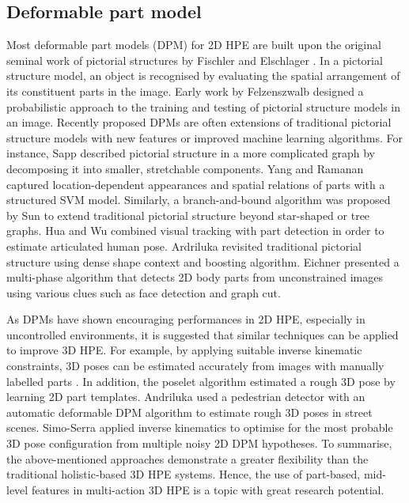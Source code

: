 \subsection{Deformable part model}  
Most deformable part models (DPM) for 2D HPE are built upon the original seminal work of pictorial structures by Fischler and Elschlager \cite{Fischler1981}. In a pictorial structure model, an object is recognised by evaluating the spatial arrangement of its constituent parts in the image. Early work by Felzenszwalb \etal \cite{Felzenszwalb2000, Felzenszwalb2005} designed a probabilistic approach to the training and testing of pictorial structure models in an image. Recently proposed DPMs are often extensions of traditional pictorial structure models with new features or improved machine learning algorithms. For instance, Sapp \etal \cite{Sapp2011} described pictorial structure in a more complicated graph by decomposing it into smaller, stretchable components. Yang and Ramanan \cite{Yang2011} captured location-dependent appearances and spatial relations of parts with a structured SVM model. Similarly, a branch-and-bound algorithm was proposed by Sun \etal \cite{Sun2012a} to extend traditional pictorial structure beyond star-shaped or tree graphs. Hua and Wu \cite{Hua2007} combined visual tracking with part detection in order to estimate articulated human pose. Ardriluka \etal \cite{Andriluka2009} revisited traditional pictorial structure using dense shape context and boosting algorithm. Eichner \etal \cite{Eichner2012} presented a multi-phase algorithm that detects 2D body parts from unconstrained images using various clues such as face detection and graph cut. 

As DPMs have shown encouraging performances in 2D HPE, especially in uncontrolled environments, it is suggested that similar techniques can be applied to improve 3D HPE. For example, by applying suitable inverse kinematic constraints, 3D poses can be estimated accurately from images with manually labelled parts \cite{Wei2009, Ramakrishna2012}. In addition, the poselet algorithm \cite{Bourdev2009} estimated a rough 3D pose by learning 2D part templates. Andriluka \etal \cite{Andriluka2010} used a pedestrian detector with an automatic deformable DPM algorithm to estimate rough 3D poses in street scenes. Simo-Serra \etal \cite{Simo-Serra2012} applied inverse kinematics to optimise for the most probable 3D pose configuration from multiple noisy 2D DPM hypotheses. To summarise, the above-mentioned approaches demonstrate a greater flexibility than the traditional holistic-based 3D HPE systems. Hence, the use of part-based, mid-level features in multi-action 3D HPE is a topic with great research potential. 


